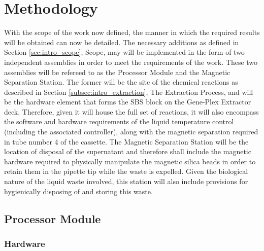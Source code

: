\chapter{Methodology}
\label{cha:methodology}

With the scope of the work now defined, the manner in which the required results will be obtained can now be detailed. The necessary additions as defined in Section \ref*{sec:intro_scope}, Scope, may will be implemented in the form of two independent assemblies in order to meet the requirements of the work. These two assemblies will be refereed to as the Processor Module and the Magnetic Separation Station. The former will be the site of the chemical reactions as described in Section \ref{subsec:intro_extraction}, The Extraction Process, and will be the hardware element that forms the SBS block on the Gene-Plex Extractor deck. Therefore, given it will house the full set of reactions, it will also encompass the software and hardware requirements of the liquid temperature control (including the associated controller), along with the magnetic separation required in tube number 4 of the cassette. The Magnetic Separation Station will be the location of disposal of the supernatant and therefore shall include the magnetic hardware required to physically manipulate the magnetic silica beads in order to retain them in the pipette tip while the waste is expelled. Given the biological nature of the liquid waste involved, this station will also include provisions for hygienically disposing of and storing this waste.

\section{Processor Module}

\subsection{Hardware}

